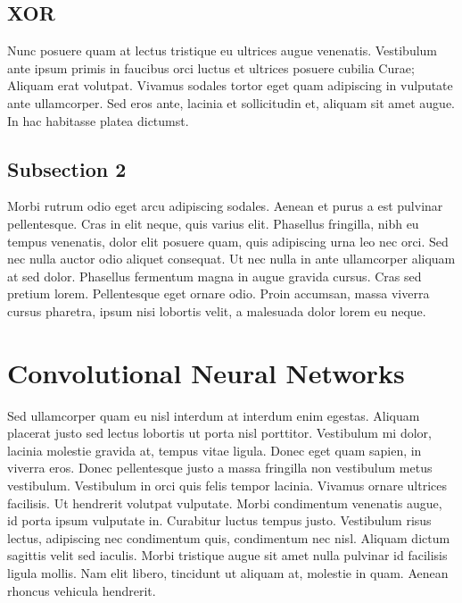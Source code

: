 \subsection{XOR}

Nunc posuere quam at lectus tristique eu ultrices augue venenatis. Vestibulum ante ipsum primis in faucibus orci luctus et ultrices posuere cubilia Curae; Aliquam erat volutpat. Vivamus sodales tortor eget quam adipiscing in vulputate ante ullamcorper. Sed eros ante, lacinia et sollicitudin et, aliquam sit amet augue. In hac habitasse platea dictumst.


\subsection{Subsection 2}
Morbi rutrum odio eget arcu adipiscing sodales. Aenean et purus a est pulvinar pellentesque. Cras in elit neque, quis varius elit. Phasellus fringilla, nibh eu tempus venenatis, dolor elit posuere quam, quis adipiscing urna leo nec orci. Sed nec nulla auctor odio aliquet consequat. Ut nec nulla in ante ullamcorper aliquam at sed dolor. Phasellus fermentum magna in augue gravida cursus. Cras sed pretium lorem. Pellentesque eget ornare odio. Proin accumsan, massa viverra cursus pharetra, ipsum nisi lobortis velit, a malesuada dolor lorem eu neque.


\section{Convolutional Neural Networks}

Sed ullamcorper quam eu nisl interdum at interdum enim egestas. Aliquam placerat justo sed lectus lobortis ut porta nisl porttitor. Vestibulum mi dolor, lacinia molestie gravida at, tempus vitae ligula. Donec eget quam sapien, in viverra eros. Donec pellentesque justo a massa fringilla non vestibulum metus vestibulum. Vestibulum in orci quis felis tempor lacinia. Vivamus ornare ultrices facilisis. Ut hendrerit volutpat vulputate. Morbi condimentum venenatis augue, id porta ipsum vulputate in. Curabitur luctus tempus justo. Vestibulum risus lectus, adipiscing nec condimentum quis, condimentum nec nisl. Aliquam dictum sagittis velit sed iaculis. Morbi tristique augue sit amet nulla pulvinar id facilisis ligula mollis. Nam elit libero, tincidunt ut aliquam at, molestie in quam. Aenean rhoncus vehicula hendrerit.

